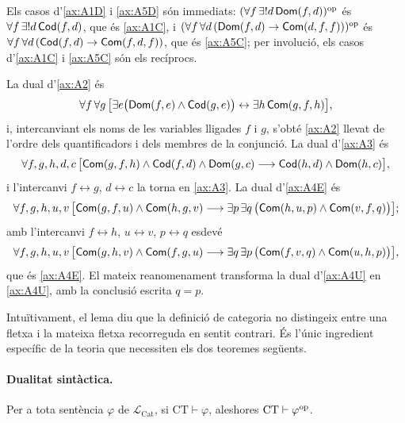 \begin{prova}
Els casos d'\eqref{ax:A1D} i \eqref{ax:A5D} són immediats: $(\forall f\,\exists!d\,\mathsf{Dom}(f,d))^{\mathrm{op}}$ és $\forall f\,\exists!d\,\mathsf{Cod}(f,d)$, que és \eqref{ax:A1C}, i $(\forall f\,\forall d\,(\mathsf{Dom}(f,d)\to\mathsf{Com}(d,f,f)))^{\mathrm{op}}$ és $\forall f\,\forall d\,(\mathsf{Cod}(f,d)\to\mathsf{Com}(f,d,f))$, que és \eqref{ax:A5C}; per involució, els casos d'\eqref{ax:A1C} i \eqref{ax:A5C} són els recíprocs.

La dual d'\eqref{ax:A2} és
\[
\forall f\,\forall g\,\bigl[\exists e\bigl(\mathsf{Dom}(f,e)\land\mathsf{Cod}(g,e)\bigr)\leftrightarrow\exists h\,\mathsf{Com}(g,f,h)\bigr],
\]
i, intercanviant els noms de les variables lligades $f$ i $g$, s'obté \eqref{ax:A2} llevat de l'ordre dels quantificadors i dels membres de la conjunció. La dual d'\eqref{ax:A3} és
\[
\forall f,g,h,d,c\,\bigl[\mathsf{Com}(g,f,h)\land\mathsf{Cod}(f,d)\land\mathsf{Dom}(g,c)\longrightarrow\mathsf{Cod}(h,d)\land\mathsf{Dom}(h,c)\bigr],
\]
i l'intercanvi $f\leftrightarrow g$, $d\leftrightarrow c$ la torna en \eqref{ax:A3}. La dual d'\eqref{ax:A4E} és
\[
\forall f,g,h,u,v\,\bigl[\mathsf{Com}(g,f,u)\land\mathsf{Com}(h,g,v)\longrightarrow\exists p\,\exists q\,\bigl(\mathsf{Com}(h,u,p)\land\mathsf{Com}(v,f,q)\bigr)\bigr];
\]
amb l'intercanvi $f\leftrightarrow h$, $u\leftrightarrow v$, $p\leftrightarrow q$ esdevé
\[
\forall f,g,h,u,v\,\bigl[\mathsf{Com}(g,h,v)\land\mathsf{Com}(f,g,u)\longrightarrow\exists q\,\exists p\,\bigl(\mathsf{Com}(f,v,q)\land\mathsf{Com}(u,h,p)\bigr)\bigr],
\]
que és \eqref{ax:A4E}. El mateix reanomenament transforma la dual d'\eqref{ax:A4U} en \eqref{ax:A4U}, amb la conclusió escrita $q=p$.
\end{prova}

Intuïtivament, el lema diu que la definició de categoria no distingeix entre una fletxa i la mateixa fletxa recorreguda en sentit contrari. És l'únic ingredient específic de la teoria que necessiten els dos teoremes següents.

\paragraph{Dualitat sintàctica.}\leavevmode\par

\begin{teorema}\label{teo:ar-dualitat-sint}
Per a tota sentència $\varphi$ de $\mathcal L_{\mathrm{Cat}}$, si $\mathrm{CT}\vdash\varphi$, aleshores $\mathrm{CT}\vdash\varphi^{\mathrm{op}}$.
\end{teorema}

